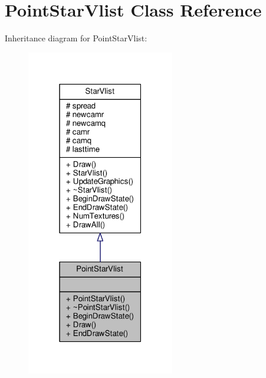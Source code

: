 \hypertarget{classPointStarVlist}{}\section{Point\+Star\+Vlist Class Reference}
\label{classPointStarVlist}


Inheritance diagram for Point\+Star\+Vlist\+:
\nopagebreak
\begin{figure}[H]
\begin{center}
\leavevmode
\includegraphics[width=183pt]{d5/d87/classPointStarVlist__inherit__graph}
\end{center}
\end{figure}


